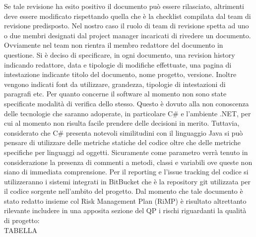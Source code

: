 Se tale revisione ha esito positivo il documento può essere rilasciato, altrimenti deve essere modificato rispettando quella che è la checklist compilata dal team di revisione predisposto.
Nel nostro caso il ruolo di team di revisione spetta ad uno o due membri designati dal project manager incaricati di rivedere un documento. Ovviamente nel team non rientra il membro redattore del documento in questione.
Si è deciso di specificare, in ogni documento, una revision history indicando redattore, data e tipologie di modifiche effettuate, una pagina di intestazione indicante titolo del documento, nome progetto, versione. 
Inoltre vengono indicati font da utilizzare, grandezza, tipologie di intestazioni di paragrafi etc.
Per quanto concerne il software al momento non sono state specificate modalità di verifica dello stesso. Questo è dovuto alla non conoscenza delle tecnologie che saranno adoperate, in particolare C\# e l’ambiente .NET, per cui al momento non risulta facile prendere delle decisioni in merito.
Tuttavia, considerato che C\# presenta notevoli similitudini con il linguaggio Java si può pensare di utilizzare delle metriche statiche del codice oltre che delle metriche specifiche per linguaggi ad oggetti.
Sicuramente come parametro verrà tenuto in considerazione la presenza di commenti a metodi, classi e variabili ove queste non siano di immediata comprensione.
Per il reporting e l’issue tracking del codice si utilizzeranno i sistemi integrati in BitBucket che è la repository git utilizzata per il codice sorgente nell’ambito del progetto.
Dal momento che tale documento è stato redatto insieme col Risk Management Plan (RiMP) è risultato altrettanto rilevante includere in una apposita sezione del QP i rischi riguardanti la qualità di progetto:
\\
TABELLA
\\

